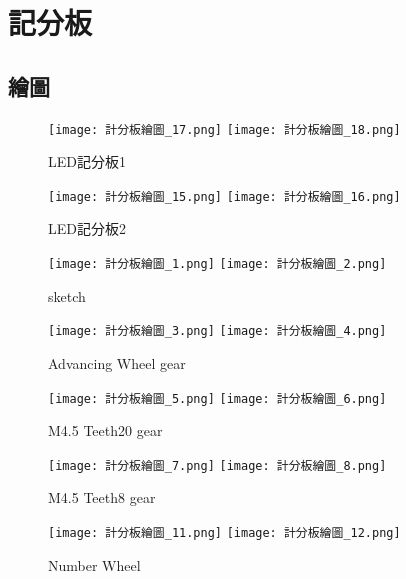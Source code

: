 \chapter{記分板}
\section{繪圖}
{
\begin{figure}[thb!]
  \centering
  \texttt{[image: 計分板繪圖\_17.png]}
  \centering
  \texttt{[image: 計分板繪圖\_18.png]}
  \caption{LED記分板1}
  \label{fig:photo1}
\end{figure}

\begin{figure}[thb!]
  \centering
  \texttt{[image: 計分板繪圖\_15.png]}
  \centering
  \texttt{[image: 計分板繪圖\_16.png]}
  \caption{LED記分板2}
  \label{fig:photo2}
\end{figure}

\begin{figure}[thb!]
  \centering
  \texttt{[image: 計分板繪圖\_1.png]}
  \centering
  \texttt{[image: 計分板繪圖\_2.png]}
  \caption{sketch}
  \label{fig:photo3}
\end{figure}

\begin{figure}[thb!]
  \centering
  \texttt{[image: 計分板繪圖\_3.png]}
  \centering
  \texttt{[image: 計分板繪圖\_4.png]}
  \caption{Advancing Wheel gear}
  \label{fig:photo4}
\end{figure}

\begin{figure}[thb!]
  \centering
  \texttt{[image: 計分板繪圖\_5.png]}
  \centering
  \texttt{[image: 計分板繪圖\_6.png]}
  \caption{M4.5 Teeth20 gear}
  \label{fig:photo5}
\end{figure}

\begin{figure}[thb!]
  \centering
  \texttt{[image: 計分板繪圖\_7.png]}
  \centering
  \texttt{[image: 計分板繪圖\_8.png]}
  \caption{M4.5 Teeth8 gear}
  \label{fig:photo6}
\end{figure}

\begin{figure}[thb!]
  \centering
  \texttt{[image: 計分板繪圖\_11.png]}
  \centering
  \texttt{[image: 計分板繪圖\_12.png]}
  \caption{Number Wheel}
  \label{fig:photo7}
\end{figure}

}
